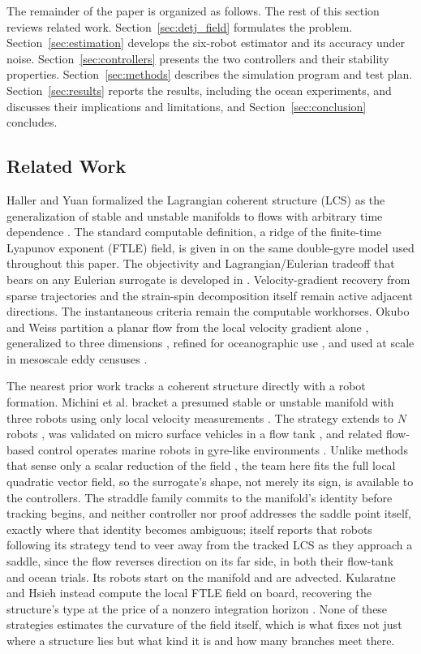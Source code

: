 \documentclass[lettersize,journal]{IEEEtran}
\begin{document}
The remainder of the paper is organized as follows. The rest of this
section reviews related work. Section~\ref{sec:detj_field} formulates
the problem. Section~\ref{sec:estimation} develops the six-robot
estimator and its accuracy under noise. Section~\ref{sec:controllers}
presents the two controllers and their stability properties.
Section~\ref{sec:methods}
describes the simulation program and test plan.
Section~\ref{sec:results} reports the results, including the ocean
experiments, and discusses their implications and limitations, and
Section~\ref{sec:conclusion} concludes.

\subsection{Related Work}
\label{sec:related_robots}

Haller and Yuan formalized the Lagrangian coherent structure (LCS) as
the generalization of stable and unstable manifolds to flows with
arbitrary time dependence \cite{13}. The standard computable definition,
a ridge of the finite-time Lyapunov exponent (FTLE) field, is given in
\cite{15} on the same double-gyre model used throughout this paper. The
objectivity and Lagrangian/Eulerian tradeoff that bears on any Eulerian
surrogate is developed in \cite{23,24,25}. Velocity-gradient
recovery from sparse trajectories \cite{26} and the strain-spin
decomposition itself \cite{27} remain active adjacent directions. The
instantaneous criteria remain the computable workhorses. Okubo and Weiss
partition a planar flow from the local velocity gradient alone
\cite{28,29}, generalized to three dimensions \cite{30}, refined for
oceanographic use \cite{31}, and used at scale in mesoscale eddy censuses
\cite{16}.

The nearest prior work tracks a coherent structure directly with a
robot formation. Michini et al. bracket a presumed stable or unstable
manifold with three robots using only local velocity measurements
\cite{17}. The strategy extends to $N$ robots \cite{18}, was validated
on micro surface vehicles in a flow tank \cite{19}, and related
flow-based control operates marine robots in gyre-like environments
\cite{20}. Unlike methods that sense only a scalar reduction of the
field \cite{32}, the team here fits the full local quadratic vector
field, so the surrogate's shape, not merely its sign, is available to
the controllers. The straddle family commits to the manifold's identity
before tracking begins, and neither controller nor proof addresses the
saddle point itself, exactly where that identity becomes ambiguous;
\cite{17} itself reports that robots following its strategy tend to
veer away from the tracked LCS as they approach a saddle, since the
flow reverses direction on its far side, in both their flow-tank and
ocean trials. Its robots start on the manifold and are advected.
Kularatne and Hsieh instead compute the local FTLE field on board,
recovering the structure's type at the price of a nonzero integration
horizon \cite{21}. None of these strategies estimates the curvature of
the field itself, which is what fixes not just where a structure lies
but what kind it is and how many branches meet there.
\end{document}
